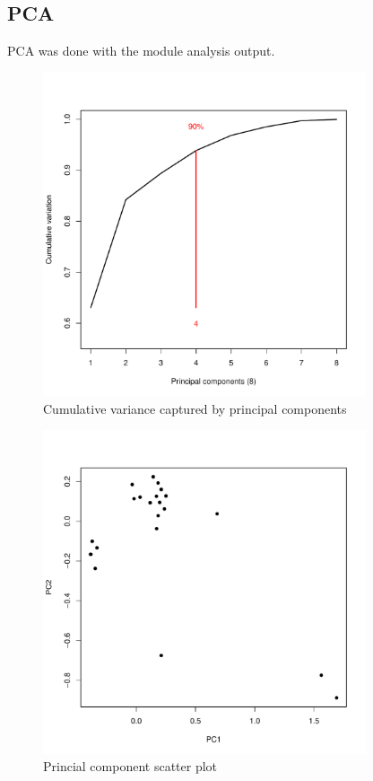 \documentclass{article}
\begin{document}
\subsection*{PCA}
PCA was done with the module analysis output.\\
\begin{figure}\centering
\includegraphics[width=0.85\textwidth]{PCA/pca_var.pdf}
\caption{Cumulative variance captured by principal components}\label{fig:PCA/pca_var.pdf}\end{figure}
\begin{figure}\centering
\includegraphics[width=0.85\textwidth]{PCA/pca_plot.pdf}
\caption{Princial component scatter plot}\label{fig:PCA/pca_plot.pdf}\end{figure}
\end{document}
